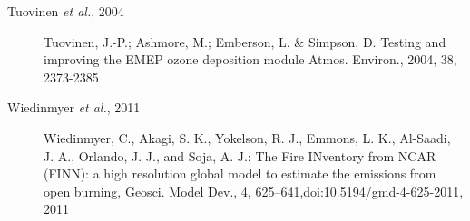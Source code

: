 \documentclass[a4paper,12pt]{report}
\begin{document}
\begin{description}

\item[Tuovinen {\sl et al.}, 2004] Tuovinen, J.-P.; Ashmore, M.; Emberson, L. \& Simpson, D. Testing and improving the EMEP ozone deposition module Atmos. Environ., 2004, 38, 2373-2385

\item[Wiedinmyer {\sl et al.}, 2011] Wiedinmyer, C., Akagi, S. K., Yokelson, R. J., Emmons, L. K., Al-Saadi, J. A., Orlando, J. J., and Soja, A. J.: The Fire INventory from NCAR (FINN): a high resolution global model to estimate the emissions from open burning, Geosci. Model Dev., 4, 625–641,doi:10.5194/gmd-4-625-2011, 2011

\end{description}


%
%
%
%
%
%
%
%
%
%
%
%

\end{document}
